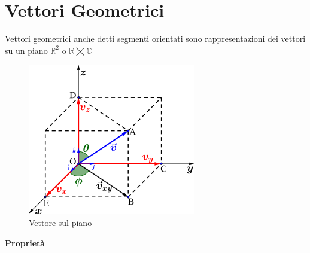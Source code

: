 \documentclass{report}
\begin{document}
\section{Vettori Geometrici}
Vettori geometrici anche detti segmenti orientati sono rappresentazioni dei vettori su un piano $\mathbb{R}^2$ o $\mathbb{R \varprod C}$ 
\begin{figure}[h]
 \centering
  \includegraphics[scale=0.5]{img/vettoreSulPiano.png}
  \caption{Vettore sul piano}
  \label{fig:image}
\end{figure}
\textbf{Proprietà}
\end{document}

